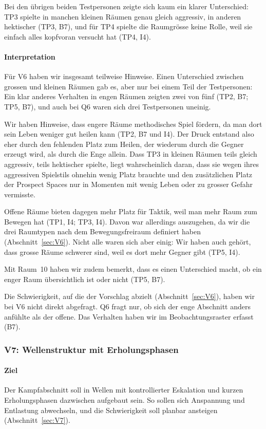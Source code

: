 \documentclass[../Main.tex]{subfiles}
\begin{document}
Bei den übrigen beiden Testpersonen zeigte sich kaum ein klarer Unterschied: TP3 spielte in manchen kleinen Räumen genau gleich aggressiv, in anderen hektischer (TP3, B7), und für TP4 spielte die Raumgrösse keine Rolle, weil sie einfach alles kopfvoran versucht hat (TP4, I4).

\paragraph{Interpretation}
Für V6 haben wir insgesamt teilweise Hinweise. Einen Unterschied zwischen grossen und kleinen Räumen gab es, aber nur bei einem Teil der Testpersonen: Ein klar anderes Verhalten in engen Räumen zeigten zwei von fünf (TP2, B7; TP5, B7), und auch bei Q6 waren sich drei Testpersonen uneinig.

Wir haben Hinweise, dass engere Räume methodisches Spiel fördern, da man dort sein Leben weniger gut heilen kann (TP2, B7 und I4). Der Druck entstand also eher durch den fehlenden Platz zum Heilen, der wiederum durch die Gegner erzeugt wird, als durch die Enge allein. Dass TP3 in kleinen Räumen teils gleich aggressiv, teils hektischer spielte, liegt wahrscheinlich daran, dass sie wegen ihres aggressiven Spielstils ohnehin wenig Platz brauchte und den zusätzlichen Platz der Prospect Spaces nur in Momenten mit wenig Leben oder zu grosser Gefahr vermisste.

Offene Räume bieten dagegen mehr Platz für Taktik, weil man mehr Raum zum Bewegen hat (TP1, I4; TP3, I4). Davon war allerdings auszugehen, da wir die drei Raumtypen nach dem Bewegungsfreiraum definiert haben (Abschnitt~\ref{sec:V6}). Nicht alle waren sich aber einig: Wir haben auch gehört, dass grosse Räume schwerer sind, weil es dort mehr Gegner gibt (TP5, I4).

Mit Raum~10 haben wir zudem bemerkt, dass es einen Unterschied macht, ob ein enger Raum übersichtlich ist oder nicht (TP5, B7).

Die Schwierigkeit, auf die der Vorschlag abzielt (Abschnitt~\ref{sec:V6}), haben wir bei V6 nicht direkt abgefragt. Q6 fragt nur, ob sich der enge Abschnitt anders anfühlte als der offene. Das Verhalten haben wir im Beobachtungsraster erfasst (B7).

\subsubsection{V7: Wellenstruktur mit Erholungsphasen}

\paragraph{Ziel}
Der Kampfabschnitt soll in Wellen mit kontrollierter Eskalation und kurzen Erholungsphasen dazwischen aufgebaut sein. So sollen sich Anspannung und Entlastung abwechseln, und die Schwierigkeit soll planbar ansteigen (Abschnitt~\ref{sec:V7}).
\end{document}
